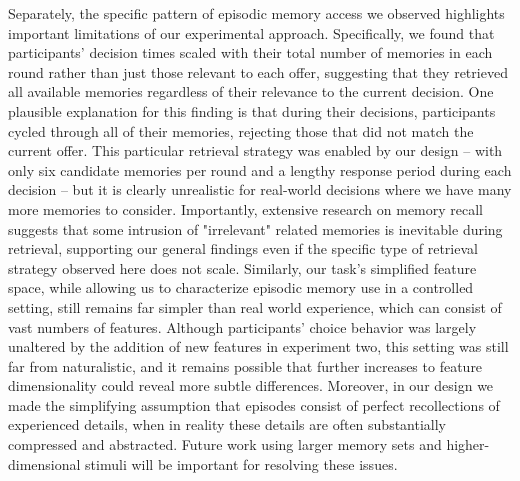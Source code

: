 \documentclass[10pt,letterpaper]{article}
\begin{document}
Separately, the specific pattern of episodic memory access we observed highlights important limitations of our experimental approach. Specifically, we found that participants' decision times scaled with their total number of memories in each round rather than just those relevant to each offer, suggesting that they retrieved all available memories regardless of their relevance to the current decision. One plausible explanation for this finding is that during their decisions, participants cycled through all of their memories, rejecting those that did not match the current offer. This particular retrieval strategy was enabled by our design -- with only six candidate memories per round and a lengthy response period during each decision -- but it is clearly unrealistic for real-world decisions where we have many more memories to consider. Importantly, extensive research on memory recall suggests that some intrusion of "irrelevant" related memories is inevitable during retrieval\cite{kahanaFoundationsHumanMemory2012}, supporting our general findings even if the specific type of retrieval strategy observed here does not scale. Similarly, our task's simplified feature space, while allowing us to characterize episodic memory use in a controlled setting, still remains far simpler than real world experience, which can consist of vast numbers of features. Although participants' choice behavior was largely unaltered by the addition of new features in experiment two, this setting was still far from naturalistic, and it remains possible that further increases to feature dimensionality could reveal more subtle differences. Moreover, in our design we made the simplifying assumption that episodes consist of perfect recollections of experienced details, when in reality these details are often substantially compressed and abstracted\cite{carmichaelExperimentalStudyEffect1932, nagySemanticCompressionEpisodic2018, zhouPatternSeparationUsing}. Future work using larger memory sets and higher-dimensional stimuli will be important for resolving these issues.
\end{document}

